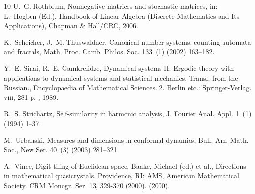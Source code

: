 \documentclass[12pt]{article}
\theoremstyle{definition}
\begin{document}
\begin{thebibliography}{10}
U.~G. Rothblum, Nonnegative matrices and stochastic matrices, in: L.~Hogben
  (Ed.), Handbook of Linear Algebra (Discrete Mathematics and Its
  Applications), {Chapman \& Hall/CRC}, 2006.

K.~Scheicher, J.~M. Thuswaldner, {Canonical number systems, counting automata
  and fractals}, Math. Proc. Camb. Philos. Soc. 133~(1) (2002) 163--182.

Y.~E. Sinai, R.~E. Gamkrelidze, {Dynamical systems II. Ergodic theory with
  applications to dynamical systems and statistical mechanics. Transl. from the
  Russian.}, {Encyclopaedia of Mathematical Sciences. 2. Berlin etc.:
  Springer-Verlag. viii, 281 p. }, 1989.

R.~S. Strichartz, {Self-similarity in harmonic analysis}, J. Fourier Anal.
  Appl. 1~(1) (1994) 1--37.

M.~Urbanski, {Measures and dimensions in conformal dynamics}, Bull. Am. Math.
  Soc., New Ser. 40~(3) (2003) 281--321.

A.~Vince, {Digit tiling of Euclidean space}, {Baake, Michael (ed.) et al.,
  Directions in mathematical quasicrystals. Providence, RI: AMS, American
  Mathematical Society. CRM Monogr. Ser. 13, 329-370 (2000).} (2000).


\end{thebibliography}
\end{document}

